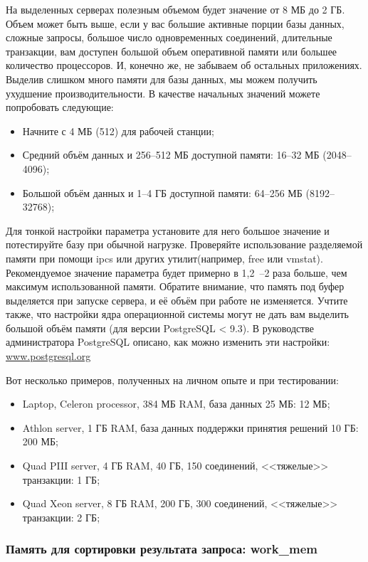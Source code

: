 На выделенных серверах полезным объемом будет значение от 8 МБ до 2 ГБ. Объем может быть выше, если у вас большие активные порции базы данных, сложные запросы, большое число
одновременных соединений, длительные транзакции, вам доступен большой объем оперативной памяти или большее количество процессоров. И, конечно же, не забываем об остальных приложениях. Выделив слишком много памяти для базы данных, мы можем получить ухудшение производительности.
В качестве начальных значений можете попробовать следующие:

\begin{itemize}
  \item Начните с 4 МБ (512) для рабочей станции;
  \item Средний объём данных и 256--512 МБ доступной памяти: 16--32 МБ (2048--4096);
  \item Большой объём данных и 1--4 ГБ доступной памяти: 64--256 МБ (8192--32768);
\end{itemize}

Для тонкой настройки параметра установите для него большое значение и потестируйте базу при обычной нагрузке. Проверяйте использование разделяемой памяти при помощи ipcs или других утилит(например, free или vmstat). Рекомендуемое значение параметра будет примерно в 1,2~--2 раза больше, чем максимум использованной памяти. Обратите внимание, что память под буфер выделяется при запуске сервера, и её объём при работе не изменяется. Учтите также, что настройки ядра операционной системы могут не дать вам выделить большой объём памяти (для версии PostgreSQL < 9.3). В руководстве администратора PostgreSQL описано, как можно изменить эти настройки: \href{http://www.postgresql.org/docs/devel/static/kernel-resources.html}{www.postgresql.org}

Вот несколько примеров, полученных на личном опыте и при тестировании:

\begin{itemize}
  \item Laptop, Celeron processor, 384 МБ RAM, база данных 25 МБ: 12 МБ;
  \item Athlon server, 1 ГБ RAM, база данных поддержки принятия решений 10 ГБ: 200 МБ;
  \item Quad PIII server, 4 ГБ RAM, 40 ГБ, 150 соединений, <<тяжелые>> транзакции: 1 ГБ;
  \item Quad Xeon server, 8 ГБ RAM, 200 ГБ, 300 соединений, <<тяжелые>> транзакции: 2 ГБ;
\end{itemize}

\subsubsection{Память для сортировки результата запроса: work\_mem}

